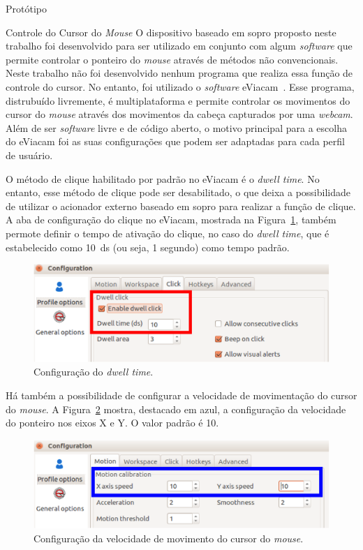 \begin{chapter}{Protótipo}
\begin{section}{Controle do Cursor do \textit{Mouse}}
O dispositivo baseado em sopro proposto neste trabalho foi desenvolvido para ser
utilizado em conjunto com algum \textit{software} que permite controlar o
ponteiro do \textit{mouse} através de métodos não convencionais. Neste trabalho
não foi desenvolvido nenhum programa que realiza essa função de controle do
cursor. No entanto, foi utilizado o \textit{software} eViacam~\cite{eviacam}.
Esse programa, distrubuído livremente, é multiplataforma e permite controlar os
movimentos do cursor do \textit{mouse} através dos movimentos da cabeça
capturados por uma \textit{webcam}. Além de ser \textit{software} livre e de
código aberto, o motivo principal para a escolha do eViacam foi as suas
configurações que podem ser adaptadas para cada perfil de usuário.

O método de clique habilitado por padrão no eViacam é o \textit{dwell time}. No
entanto, esse método de clique pode ser desabilitado, o que deixa a
possibilidade de utilizar o acionador externo baseado em sopro para realizar a
função de clique. A aba de configuração do clique no eViacam, mostrada na
Figura~\ref{fig:click}, também permote definir o tempo de ativação do clique, no
caso do \textit{dwell time}, que é estabelecido como 10~ds (ou seja, 1 segundo)
como tempo padrão. 

\begin{figure}[!h]
	\centering
	\begin{minipage}[c]{\textwidth}
	\centering
	\includegraphics[width=0.7\linewidth]{fig/eviacamclick}
	\caption{Configuração do \textit{dwell time}.}
	\label{fig:click}
	\end{minipage}
\end{figure}
\vspace{-0.75cm}
 
Há também a possibilidade de configurar a velocidade de movimentação do cursor
do \textit{mouse}. A Figura~\ref{fig:mouse} mostra, destacado em azul, a
configuração da velocidade do ponteiro nos eixos X e Y. O valor padrão é 10.

\begin{figure}[!h]
	\centering
	\begin{minipage}[c]{\textwidth}
	\centering
	\includegraphics[width=0.7\linewidth]{fig/EviacamConfiguration}
	\caption{Configuração da velocidade de movimento do cursor do \textit{mouse}.}
	\label{fig:mouse}
	\end{minipage}
\end{figure}


\end{section}
\end{chapter}
